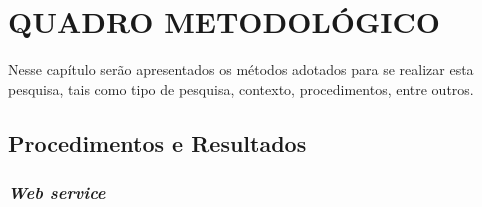 \chapter{QUADRO METODOLÓGICO}

	\par Nesse capítulo serão apresentados os métodos adotados para se realizar esta
pesquisa, tais como tipo de pesquisa, contexto, procedimentos, entre outros.
	
	
	
	
	\section{Procedimentos e Resultados}
	
	
	
			\subsection{\textit{Web service}}	
				
	
